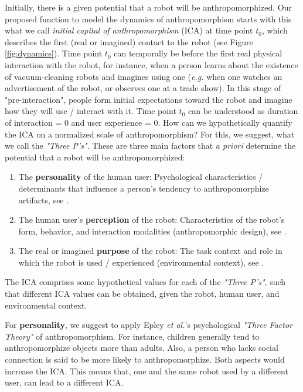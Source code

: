 \documentclass[lettersize, apacite, twoside, HRI]{apa_HRI}
\begin{document}
	Initially, there is a given potential that a robot will be anthropomorphized. Our proposed function to model the dynamics of anthropomorphism starts with this what we call \textit{initial capital of anthropomorphism} (ICA) at time point $t_{0}$, which describes the first (real or imagined) contact to the robot (see Figure \ref{fig:dynamics}). Time point $t_{0}$ can temporally be before the first real physical interaction with the robot, for instance, when a person learns about the existence of vacuum-cleaning robots and imagines using one (\textit{e.g.} when one watches an advertisement of the robot, or observes one at a trade show). In this stage of "pre-interaction", people form initial expectations toward the robot and imagine how they will use / interact with it. Time point $t_{0}$ can be understood as duration of interaction = 0 and user experience = 0. How can we hypothetically quantify the ICA on a normalized scale of anthropomorphism? For this, we suggest, what we call the \textit{"Three P's"}. These are three main factors that \textit{a priori} determine the potential that a robot will be anthropomorphized:
	
\begin{enumerate}

	\item The \textbf{personality} of the human user: Psychological characteristics / determinants that influence a person's tendency to anthropomorphize artifacts, see \cite{epley_seeing_2007}.
	
	\item The human user's \textbf{perception} of the robot: Characteristics of the robot's form, behavior, and interaction modalities (anthropomorphic design), see \cite{fong_survey_2003}.
	
	\item The real or imagined \textbf{purpose} of the robot: The task context and role in which the robot is used / experienced (environmental context), see \cite{joosse_what_2013}.

\end{enumerate}	

	The ICA comprises some hypothetical values for each of the \textit{"Three P's"}, such that different ICA values can be obtained, given the robot, human user, and environmental context.
	
	For \textbf{personality}, we suggest to apply Epley \textit{et al.}'s \cite{epley_seeing_2007} psychological \textit{"Three Factor Theory"} of anthropomorphism. For instance, children generally tend to anthropomorphize objects more than adults. Also, a person who lacks social connection is said to be more likely to anthropomorphize. Both aspects would increase the ICA. This means that, one and the same robot used by a different user, can lead to a different ICA.
	
\end{document}
